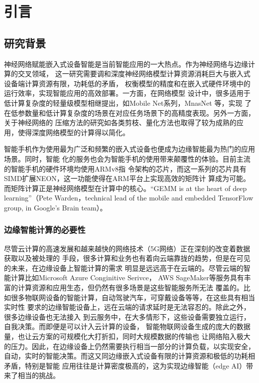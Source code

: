 
\chapter{引言}
\label{cha:intro}

\section{研究背景}

神经网络赋能嵌入式设备智能是当前智能应用的一大热点。作为神经网络与边缘计算的交叉领域，
这一研究需要调和深度神经网络模型计算资源消耗巨大与嵌入式设备端计算资源有限，功耗低的矛盾，
权衡模型的精度和在嵌入式硬件环境中的运行效率，实现智能应用的高效部署。一方面，在网络模型
设计中，很多适用于低计算复杂度的轻量级模型相继提出，如Mobile Net系列，MnasNet 等，实现
了在低参数量和低计算复杂度的场景在对应任务场景下的高精度表现。另外一方面，关于神经网络的
压缩方法的研究如各类剪枝、量化方法也取得了较为成熟的应用，使得深度网络模型的计算得以简化。


智能手机作为使用最为广泛和频繁的嵌入式设备也便成为边缘智能最为热门的应用场景。同时，智能
化的服务也会为智能手机的使用带来颠覆性的体验。目前主流的智能手机的硬件环境均使用ARMv8指
令架构的芯片，而这一系列的芯片具有SIMD扩展NEON，这一功能使得在ARM平台上实现高效的矩阵计
算成为可能。而矩阵计算正是神经网络模型在计算中的核心。“GEMM is at the heart of deep
 learning”（Pete Warden，technical lead of the mobile and embedded TensorFlow 
 group, in Google's Brain team）。

\subsection{边缘智能计算的必要性}

尽管云计算的高速发展和越来越快的网络技术（5G网络）正在深刻的改变着数据获取以及被处理的
手段，很多计算和业务也有着向云端靠拢的趋势，但是在可见的未来，在边缘设备上智能计算的需求
明显是远远高于在云端的。尽管云端的智能计算比如Microsoft Azure Conginitive Serivce，
AWS SageMaker等服务具有丰富的计算资源和应用生态，但仍然有很多场景是这些智能服务所无法
覆盖的。比如很多物联网设备的智能计算，自动驾驶汽车，可穿戴设备等等，在这些具有相当实时性
要求的边缘智能设备上，远在云端的请求延时是无法容忍的。除此之外，很多边缘设备也无法接入
到云服务中，在大多情形下，这些设备需要独立运行，自我决策。而即便是可以计入云计算的设备，
智能物联网设备生成的庞大的数据量，也让云方案的可规模化大打折扣，同时大规模数据的传输也
让网络陷入极大的压力。因此，在边缘设备上仍然需要执行相当一部分的计算负载，以实现安全，
自动，实时的智能决策。而这又同边缘嵌入式设备有限的计算资源和极低的功耗相矛盾，特别是智能
应用往往是计算密度极高的，这为实现边缘智能（edge AI）带来了相当的挑战。

